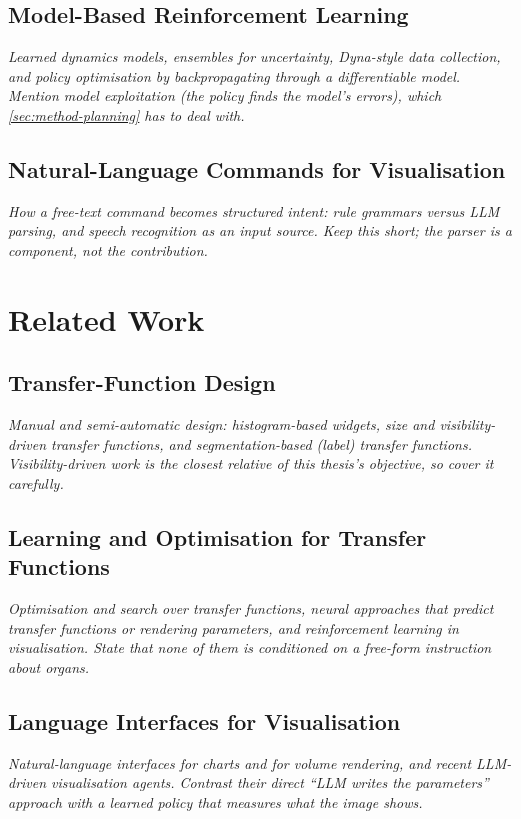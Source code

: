 \documentclass[12pt, a4paper]{book}
\newcommand{\plan}[1]{{\color{gray}\itshape #1\par}}
\begin{document}
\section{Model-Based Reinforcement Learning}
\label{sec:found-mbrl}
\plan{Learned dynamics models, ensembles for uncertainty, Dyna-style data collection, and policy optimisation by backpropagating through a differentiable model. Mention model exploitation (the policy finds the model's errors), which \cref{sec:method-planning} has to deal with.}

\section{Natural-Language Commands for Visualisation}
\label{sec:found-nl}
\plan{How a free-text command becomes structured intent: rule grammars versus LLM parsing, and speech recognition as an input source. Keep this short; the parser is a component, not the contribution.}

\chapter{Related Work}
\label{ch:related}

\section{Transfer-Function Design}
\label{sec:rel-tf}
\plan{Manual and semi-automatic design: histogram-based widgets, size and visibility-driven transfer functions, and segmentation-based (label) transfer functions. Visibility-driven work is the closest relative of this thesis's objective, so cover it carefully.}

\section{Learning and Optimisation for Transfer Functions}
\label{sec:rel-learning}
\plan{Optimisation and search over transfer functions, neural approaches that predict transfer functions or rendering parameters, and reinforcement learning in visualisation. State that none of them is conditioned on a free-form instruction about organs.}

\section{Language Interfaces for Visualisation}
\label{sec:rel-language}
\plan{Natural-language interfaces for charts and for volume rendering, and recent LLM-driven visualisation agents. Contrast their direct ``LLM writes the parameters'' approach with a learned policy that measures what the image shows.}
\end{document}
